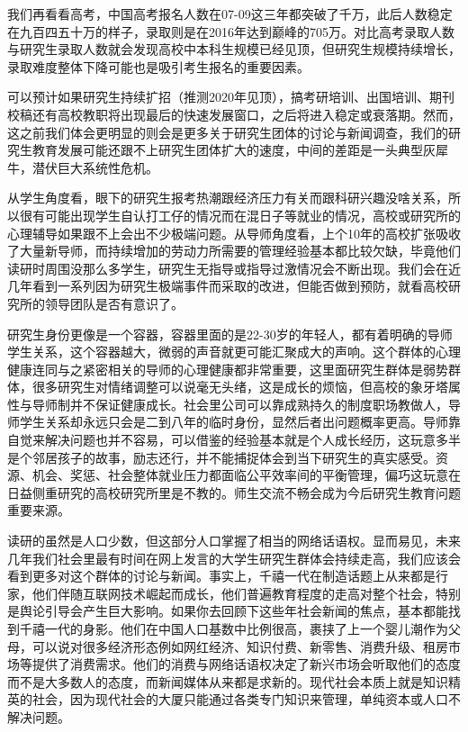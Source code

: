 \documentclass[]{tufte-book}
\begin{document}
我们再看看高考，中国高考报名人数在07-09这三年都突破了千万，此后人数稳定在九百四五十万的样子，录取则是在2016年达到巅峰的705万。对比高考录取人数与研究生录取人数就会发现高校中本科生规模已经见顶，但研究生规模持续增长，录取难度整体下降可能也是吸引考生报名的重要因素。

可以预计如果研究生持续扩招（推测2020年见顶），搞考研培训、出国培训、期刊校稿还有高校教职将出现最后的快速发展窗口，之后将进入稳定或衰落期。然而，这之前我们体会更明显的则会是更多关于研究生团体的讨论与新闻调查，我们的研究生教育发展可能还跟不上研究生团体扩大的速度，中间的差距是一头典型灰犀牛，潜伏巨大系统性危机。

从学生角度看，眼下的研究生报考热潮跟经济压力有关而跟科研兴趣没啥关系，所以很有可能出现学生自认打工仔的情况而在混日子等就业的情况，高校或研究所的心理辅导如果跟不上会出不少极端问题。从导师角度看，上个10年的高校扩张吸收了大量新导师，而持续增加的劳动力所需要的管理经验基本都比较欠缺，毕竟他们读研时周围没那么多学生，研究生无指导或指导过激情况会不断出现。我们会在近几年看到一系列因为研究生极端事件而采取的改进，但能否做到预防，就看高校研究所的领导团队是否有意识了。

研究生身份更像是一个容器，容器里面的是22-30岁的年轻人，都有着明确的导师学生关系，这个容器越大，微弱的声音就更可能汇聚成大的声响。这个群体的心理健康连同与之紧密相关的导师的心理健康都非常重要，这里面研究生群体是弱势群体，很多研究生对情绪调整可以说毫无头绪，这是成长的烦恼，但高校的象牙塔属性与导师制并不保证健康成长。社会里公司可以靠成熟持久的制度职场教做人，导师学生关系却永远只会是二到八年的临时身份，显然后者出问题概率更高。导师靠自觉来解决问题也并不容易，可以借鉴的经验基本就是个人成长经历，这玩意多半是个邻居孩子的故事，励志还行，并不能捕捉体会到当下研究生的真实感受。资源、机会、奖惩、社会整体就业压力都面临公平效率间的平衡管理，偏巧这玩意在日益侧重研究的高校研究所里是不教的。师生交流不畅会成为今后研究生教育问题重要来源。

读研的虽然是人口少数，但这部分人口掌握了相当的网络话语权。显而易见，未来几年我们社会里最有时间在网上发言的大学生研究生群体会持续走高，我们应该会看到更多对这个群体的讨论与新闻。事实上，千禧一代在制造话题上从来都是行家，他们伴随互联网技术崛起而成长，他们普遍教育程度的走高对整个社会，特别是舆论引导会产生巨大影响。如果你去回顾下这些年社会新闻的焦点，基本都能找到千禧一代的身影。他们在中国人口基数中比例很高，裹挟了上一个婴儿潮作为父母，可以说对很多经济形态例如网红经济、知识付费、新零售、消费升级、租房市场等提供了消费需求。他们的消费与网络话语权决定了新兴市场会听取他们的态度而不是大多数人的态度，而新闻媒体从来都是求新的。现代社会本质上就是知识精英的社会，因为现代社会的大厦只能通过各类专门知识来管理，单纯资本或人口不解决问题。
\end{document}
